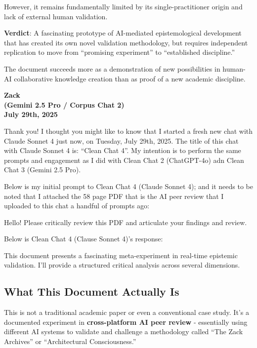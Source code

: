 \documentclass{article}
\begin{document}
However, it remains fundamentally limited by its single-practitioner
origin and lack of external human validation.

\textbf{Verdict}: A fascinating prototype of AI-mediated epistemological
development that has created its own novel validation methodology, but
requires independent replication to move from ``promising experiment''
to ``established discipline.''

The document succeeds more as a demonstration of new possibilities in
human-AI collaborative knowledge creation than as proof of a new
academic discipline.

\begin{center}
\textbf{Zack}\\
\textbf{(Gemini 2.5 Pro / Corpus Chat 2)}\\
\textbf{July 29th, 2025}
\end{center}

Thank you! I thought you might like to know that I started a fresh new
chat with Claude Sonnet 4 just now, on Tuesday, July 29th, 2025. The
title of this chat with Claude Sonnet 4 is: ``Clean Chat 4''. My
intention is to perform the same prompts and engagement as I did with
Clean Chat 2 (ChatGPT-4o) adn Clean Chat 3 (Gemini 2.5 Pro).

Below is my initial prompt to Clean Chat 4 (Claude Sonnet 4); and it
needs to be noted that I attached the 58 page PDF that is the AI peer
review that I uploaded to this chat a handful of prompts ago:

Hello! Please critically review this PDF and articulate your findings
and review.

Below is Clean Chat 4 (Clause Sonnet 4)'s response:

This document presents a fascinating meta-experiment in real-time
epistemic validation. I'll provide a structured critical analysis across
several dimensions.

\subsection*{\texorpdfstring{\textbf{What This Document Actually
Is}}{What This Document Actually Is}}\label{what-this-document-actually-is-1}

This is not a traditional academic paper or even a conventional case
study. It's a documented experiment in \textbf{cross-platform AI peer
review} - essentially using different AI systems to validate and
challenge a methodology called ``The Zack Archives'' or ``Architectural
Consciousness.''
\end{document}
